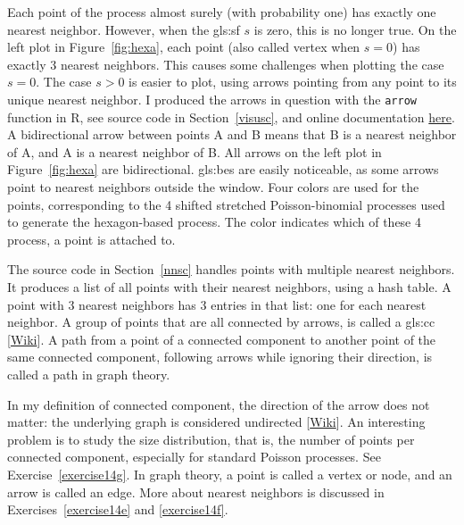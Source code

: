 \documentclass[10pt]{article}
\begin{document}
Each point of the process almost surely (with probability one) has exactly one nearest neighbor. However, when the
\gls{gls:sf} $s$ is zero, this is no longer true. On the left plot in Figure~\ref{fig:hexa}, each point (also called
\textcolor{index}{vertex} when $s=0$) has exactly 3 nearest neighbors. This causes some challenges when plotting the case $s=0$. The case $s>0$ is easier to plot, using arrows pointing from any point to its unique nearest neighbor.
I produced the arrows in question with the \texttt{arrow} function in R, see source code in Section~\ref{visusc}, and online
documentation \href{https://stat.ethz.ch/R-manual/R-devel/library/graphics/html/arrows.html}{here}.
A bidirectional arrow between points A and B means that B is a nearest neighbor of A, and A is a nearest neighbor of B. All arrows on the left plot in
Figure~\ref{fig:hexa} are bidirectional.  \Glspl{gls:be} are easily noticeable, as some arrows point to nearest neighbors outside the window.
Four colors are used for the points, corresponding to the  4 shifted stretched Poisson-binomial processes used to generate the hexagon-based process. The color indicates which of these 4 process, a point is attached to.

The source code in Section~\ref{nnsc} handles points with multiple nearest neighbors. It produces a list of all points with their nearest neighbors, using a
\textcolor{index}{hash table}. A point with 3 nearest neighbors has 3 entries in that list: one for each nearest neighbor. A group of points that are all connected by arrows, is called a \gls{gls:cc} [\href{https://en.wikipedia.org/wiki/Component_(graph_theory)}{Wiki}]. A path from a point of a connected component to another point of the same connected component, following arrows while ignoring their direction, is called a
\textcolor{index}{path} in \textcolor{index}{graph theory}.


In my definition of connected component, the direction of the arrow does not matter: the underlying
\textcolor{index}{graph} is considered \textcolor{index}{undirected}
[\href{https://en.wikipedia.org/wiki/Directed_graph}{Wiki}]. An interesting problem is to study the size distribution, that is, the number of points
per connected component, especially for standard Poisson processes. See Exercise~\ref{exercise14g}. In graph theory, a point is called
a \textcolor{index}{vertex} or
\textcolor{index}{node}, and an arrow is called an \textcolor{index}{edge}. More about nearest neighbors is
discussed in Exercises~\ref{exercise14e} and \ref{exercise14f}.
\end{document}
